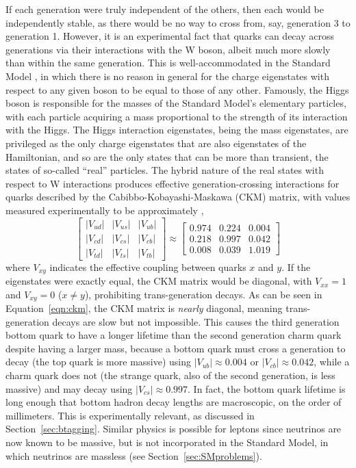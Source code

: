   If each generation were truly independent of the others, then each would be independently stable, as there would be no way to cross from, say, generation 3 to generation 1.
  However, it is an experimental fact that quarks can decay across generations via their interactions with the W boson, albeit much more slowly than within the same generation.
  This is well-accommodated in the Standard Model \cite{cabibbo,ckm}, in which there is no reason in general for the charge eigenstates with respect to any given boson to be equal to those of any other.
  Famously, the Higgs boson is responsible for the masses of the Standard Model's elementary particles, with each particle acquiring a mass proportional to the strength of its interaction with the Higgs.
  The Higgs interaction eigenstates, being the mass eigenstates, are privileged as the only charge eigenstates that are also eigenstates of the Hamiltonian, and so are the only states that can be more than transient, the states of so-called ``real'' particles.
  The hybrid nature of the real states with respect to W interactions produces effective generation-crossing interactions for quarks described by the Cabibbo-Kobayashi-Maskawa (CKM) matrix, with values measured experimentally to be approximately \cite{pdg},
  \begin{equation} \label{eqn:ckm}
    \begin{bmatrix} 
      |V_{ud}| & |V_{us}| & |V_{ub}| \\
      |V_{cd}| & |V_{cs}| & |V_{cb}| \\
      |V_{td}| & |V_{ts}| & |V_{tb}| 
    \end{bmatrix}
\approx
    \begin{bmatrix} 
      0.974 & 0.224 & 0.004 \\
      0.218 & 0.997 & 0.042 \\
      0.008 & 0.039 & 1.019
    \end{bmatrix}
  \end{equation}
  where $V_{xy}$ indicates the effective coupling between quarks $x$ and $y$.
  If the eigenstates were exactly equal, the CKM matrix would be diagonal, with $V_{xx} = 1$ and $V_{xy} = 0$ ($x \neq y$), prohibiting trans-generation decays.
  As can be seen in Equation~\ref{eqn:ckm}, the CKM matrix is {\it nearly} diagonal, meaning trans-generation decays are slow but not impossible.
  This causes the third generation bottom quark to have a longer lifetime than the second generation charm quark despite having a larger mass, because a bottom quark must cross a generation to decay  (the top quark is more massive) using $|V_{ub}| \approx 0.004$ or $|V_{cb}| \approx 0.042$, while a charm quark does not (the strange quark, also of the second generation, is less massive) and may decay using $|V_{cs}| \approx 0.997$.
  In fact, the bottom quark lifetime is long enough that bottom hadron decay lengths are macroscopic, on the order of millimeters.
  This is experimentally relevant, as discussed in Section~\ref{sec:btagging}.
  Similar physics is possible for leptons since neutrinos are now known to be massive, but is not incorporated in the Standard Model, in which neutrinos are massless (see Section~\ref{sec:SMproblems}).

